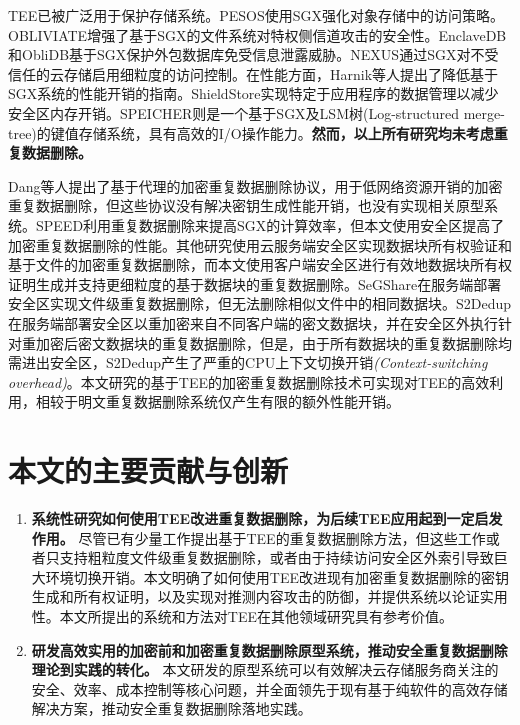 TEE已被广泛用于保护存储系统。PESOS使用SGX强化对象存储中的访问策略。OBLIVIATE增强了基于SGX的文件系统对特权侧信道攻击的安全性。EnclaveDB和ObliDB基于SGX保护外包数据库免受信息泄露威胁。NEXUS通过SGX对不受信任的云存储启用细粒度的访问控制。在性能方面，Harnik等人提出了降低基于SGX系统的性能开销的指南。ShieldStore实现特定于应用程序的数据管理以减少安全区内存开销。SPEICHER则是一个基于SGX及LSM树(Log-structured merge-tree)的键值存储系统，具有高效的I/O操作能力。\textbf{然而，以上所有研究均未考虑重复数据删除。}

Dang等人提出了基于代理的加密重复数据删除协议，用于低网络资源开销的加密重复数据删除，但这些协议没有解决密钥生成性能开销，也没有实现相关原型系统。SPEED利用重复数据删除来提高SGX的计算效率，但本文使用安全区提高了加密重复数据删除的性能。其他研究使用云服务端安全区实现数据块所有权验证和基于文件的加密重复数据删除，而本文使用客户端安全区进行有效地数据块所有权证明生成并支持更细粒度的基于数据块的重复数据删除。SeGShare在服务端部署安全区实现文件级重复数据删除，但无法删除相似文件中的相同数据块。S2Dedup在服务端部署安全区以重加密来自不同客户端的密文数据块，并在安全区外执行针对重加密后密文数据块的重复数据删除，但是，由于所有数据块的重复数据删除均需进出安全区，S2Dedup产生了严重的CPU上下文切换开销\textit{(Context-switching overhead)}。本文研究的基于TEE的加密重复数据删除技术可实现对TEE的高效利用，相较于明文重复数据删除系统仅产生有限的额外性能开销。

\section{本文的主要贡献与创新}

\begin{enumerate}[leftmargin=0em]
    \item \textbf{系统性研究如何使用TEE改进重复数据删除，为后续TEE应用起到一定启发作用。}
          尽管已有少量工作提出基于TEE的重复数据删除方法，但这些工作或者只支持粗粒度文件级重复数据删除，或者由于持续访问安全区外索引导致巨大环境切换开销。本文明确了如何使用TEE改进现有加密重复数据删除的密钥生成和所有权证明，以及实现对推测内容攻击的防御，并提供系统以论证实用性。本文所提出的系统和方法对TEE在其他领域研究具有参考价值。
    \item \textbf{研发高效实用的加密前和加密重复数据删除原型系统，推动安全重复数据删除理论到实践的转化。}
          本文研发的原型系统可以有效解决云存储服务商关注的安全、效率、成本控制等核心问题，并全面领先于现有基于纯软件的高效存储解决方案，推动安全重复数据删除落地实践。
\end{enumerate}

